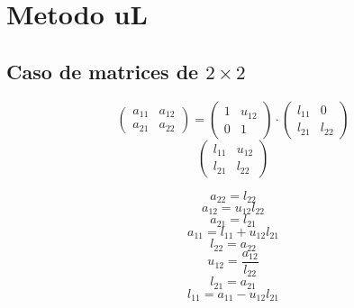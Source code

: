 \documentclass[10pt,a4paper,dvipdfmx]{article}
\begin{document}
\section{Metodo uL}
\subsection{Caso de matrices de $2\times 2$ }
$$ \left( 
\begin{array}{cc}
a_{{1}{1}} & a_{{1}{2}} \\
a_{{2}{1}} & a_{{2}{2}} 
 \end{array}
\right)
 = \left( 
\begin{array}{cc}
1 & u_{{1}{2}} \\
0 & 1 
 \end{array}
\right)
 \cdot \left( 
\begin{array}{cc}
l_{{1}{1}} & 0 \\
l_{{2}{1}} & l_{{2}{2}} 
 \end{array}
\right)
 $$
$$ \left( 
\begin{array}{cc}
l_{{1}{1}} & u_{{1}{2}} \\
l_{{2}{1}} & l_{{2}{2}} 
 \end{array}
\right)
 $$
\begin{multicols}{2}
$$ a_{{2}{2}} = l_{{2}{2}} $$
$$ a_{{1}{2}} = u_{{1}{2}} l_{{2}{2}} $$
$$ a_{{2}{1}} = l_{{2}{1}} $$
$$ a_{{1}{1}} = l_{{1}{1}} + u_{{1}{2}} l_{{2}{1}} $$
\vfill\null
\columnbreak
$$ l_{{2}{2}} = a_{{2}{2}} $$
$$ u_{{1}{2}} = \dfrac{a_{{1}{2}}}{l_{{2}{2}}} $$
$$ l_{{2}{1}} = a_{{2}{1}} $$
$$ l_{{1}{1}} = a_{{1}{1}}- u_{{1}{2}} l_{{2}{1}} $$
\end{multicols}
\end{document}
